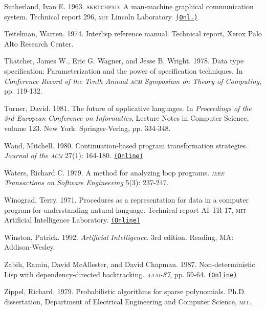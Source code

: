 \documentclass[8pt,oneside]{book}
\newcommand{\acronym}[1]{\textsc{\MakeLowercase{#1}}}
\newcommand{\code}[1]{\texttt{#1}}
\begin{document}
 \label{Sutherland (1963)}
Sutherland, Ivan E.  1963.  \acronym{SKETCHPAD}: A man-machine graphical
communication system.  Technical report 296, \acronym{MIT} Lincoln Laboratory.
\href{http://citeseer.ist.psu.edu/viewdoc/summary?doi=10.1.1.10.4290}{\code{(Onl.)}}

 \label{Teitelman 1974}
Teitelman, Warren.  1974.  Interlisp reference manual.  Technical report, Xerox
Palo Alto Research Center.

 \label{Thatcher et al. 1978}
Thatcher, James W., Eric G. Wagner, and Jesse B. Wright. 1978.  Data type
specification: Parameterization and the power of specification techniques. In
\textit{Conference Record of the Tenth Annual \acronym{ACM} Symposium on Theory
of Computing}, pp. 119-132.

 \label{Turner 1981}
Turner, David.  1981.  The future of applicative languages.  In
\textit{Proceedings of the 3rd European Conference on Informatics}, Lecture Notes
in Computer Science, volume 123. New York: Springer-Verlag, pp.  334-348.

 \label{Wand 1980}
Wand, Mitchell.  1980.  Continuation-based program transformation strategies.
\textit{Journal of the \acronym{ACM}} 27(1): 164-180.
\href{http://citeseerx.ist.psu.edu/viewdoc/summary?doi=10.1.1.83.8567}{\code{(Online)}}

 \label{Waters (1979)}
Waters, Richard C.  1979.  A method for analyzing loop programs.
\textit{\acronym{IEEE} Transactions on Software Engineering} 5(3): 237-247.

Winograd, Terry.  1971.  Procedures as a representation for data in a computer
program for understanding natural language.  Technical report AI TR-17,
\acronym{MIT} Artificial Intelligence Laboratory.
\href{http://dspace.mit.edu/handle/1721.1/7095}{\code{(Online)}}

 \label{Winston 1992}
Winston, Patrick. 1992. \textit{Artificial Intelligence}.  3rd edition.  Reading,
MA: Addison-Wesley.

 \label{Zabih et al. 1987}
Zabih, Ramin, David McAllester, and David Chapman.  1987.  Non-deterministic
Lisp with dependency-directed backtracking.  \textit{\acronym{AAAI}-87},
pp. 59-64.
\href{http://www.aaai.org/Papers/AAAI/1987/AAAI87-011.pdf}{\code{(Online)}}

 \label{Zippel (1979)}
Zippel, Richard.  1979.  Probabilistic algorithms for sparse polynomials.
Ph.D. dissertation, Department of Electrical Engineering and Computer Science,
\acronym{MIT}.
\end{document}

